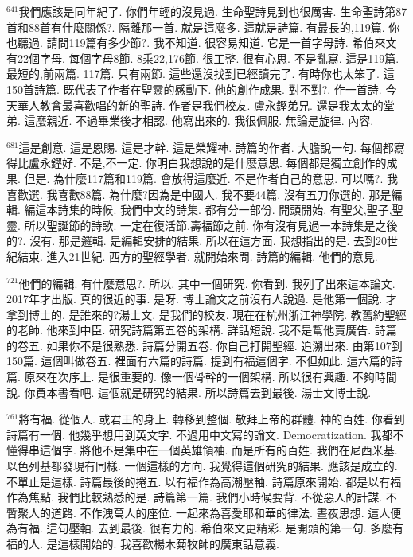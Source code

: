 \documentclass{book}
\begin{document}
$^{641}$我們應該是同年紀了.
你們年輕的沒見過.
生命聖詩見到也很厲害.
生命聖詩第87首和88首有什麼關係?.
隔離那一首.
就是這麼多.
這就是詩篇.
有最長的,119篇.
你也聽過.
請問119篇有多少節?.
我不知道.
很容易知道.
它是一首字母詩.
希伯來文有22個字母.
每個字母8節.
8乘22,176節.
很工整.
很有心思.
不是亂寫.
這是119篇.
最短的,前兩篇.
117篇.
只有兩節.
這些還沒找到已經讀完了.
有時你也太笨了.
這150首詩篇.
既代表了作者在聖靈的感動下.
他的創作成果.
對不對?.
作一首詩.
今天華人教會最喜歡唱的新的聖詩.
作者是我們校友.
盧永鏗弟兄.
還是我太太的堂弟.
這麼親近.
不過畢業後才相認.
他寫出來的.
我很佩服.
無論是旋律.
內容.

$^{681}$這是創意.
這是恩賜.
這是才幹.
這是榮耀神.
詩篇的作者.
大膽說一句.
每個都寫得比盧永鏗好.
不是,不一定.
你明白我想說的是什麼意思.
每個都是獨立創作的成果.
但是.
為什麼117篇和119篇.
會放得這麼近.
不是作者自己的意思.
可以嗎?.
我喜歡選.
我喜歡88篇.
為什麼?因為是中國人.
我不要44篇.
沒有五刀你選的.
那是編輯.
編這本詩集的時候.
我們中文的詩集.
都有分一部份.
開頭開始.
有聖父,聖子,聖靈.
所以聖誕節的詩歌.
一定在復活節,壽福節之前.
你有沒有見過一本詩集是之後的?.
沒有.
那是邏輯.
是編輯安排的結果.
所以在這方面.
我想指出的是.
去到20世紀結束.
進入21世紀.
西方的聖經學者.
就開始來問.
詩篇的編輯.
他們的意見.

$^{721}$他們的編輯.
有什麼意思?.
所以.
其中一個研究.
你看到.
我列了出來這本論文.
2017年才出版.
真的很近的事.
是呀.
博士論文之前沒有人說過.
是他第一個說.
才拿到博士的.
是誰來的?湯士文.
是我們的校友.
現在在杭州浙江神學院.
教舊約聖經的老師.
他來到中臣.
研究詩篇第五卷的架構.
詳話短說.
我不是幫他賣廣告.
詩篇的卷五.
如果你不是很熟悉.
詩篇分開五卷.
你自己打開聖經.
追溯出來.
由第107到150篇.
這個叫做卷五.
裡面有六篇的詩篇.
提到有福這個字.
不但如此.
這六篇的詩篇.
原來在次序上.
是很重要的.
像一個骨幹的一個架構.
所以很有興趣.
不夠時間說.
你買本書看吧.
這個就是研究的結果.
所以詩篇去到最後.
湯士文博士說.

$^{761}$將有福.
從個人.
或君王的身上.
轉移到整個.
敬拜上帝的群體.
神的百姓.
你看到詩篇有一個.
他幾乎想用到英文字.
不過用中文寫的論文.
Democratization.
我都不懂得串這個字.
將他不是集中在一個英雄領袖.
而是所有的百姓.
我們在尼西米基.
以色列基都發現有同樣.
一個這樣的方向.
我覺得這個研究的結果.
應該是成立的.
不單止是這樣.
詩篇最後的捲五.
以有福作為高潮壓軸.
詩篇原來開始.
都是以有福作為焦點.
我們比較熟悉的是.
詩篇第一篇.
我們小時候要背.
不從惡人的計謀.
不暫聚人的道路.
不作洩萬人的座位.
一起來為喜愛耶和華的律法.
晝夜思想.
這人便為有福.
這句壓軸.
去到最後.
很有力的.
希伯來文更精彩.
是開頭的第一句.
多麼有福的人.
是這樣開始的.
我喜歡楊木菊牧師的廣東話意義.
\end{document}
